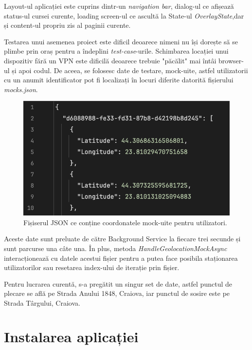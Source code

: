 Layout-ul aplicației este cuprins dintr-un \textit{navigation bar}, dialog-ul ce afișează status-ul cursei curente, loading screen-ul
ce ascultă la State-ul \textit{OverlayState},dar și content-ul propriu zis al paginii curente.

Testarea unui asemenea proiect este dificil deoarece nimeni nu își dorește să se plimbe prin oraș pentru a îndeplini \textit{test-case}-urile.
Schimbarea locației unui dispozitiv fără un VPN este dificilă deoarece trebuie "păcălit" mai întâi browser-ul și apoi codul.
De aceea, se folosesc date de testare, mock-uite, astfel utilizatorii cu un anumit identificator pot fi localizați în locuri
diferite datorită fișierului \textit{mocks.json}.

\begin{figure}[H]
    \centering
    \includegraphics[width=14cm]{Assets/dynamicMocks.png}
    \caption{Fișiserul JSON ce conține coordonatele mock-uite pentru utilizatori.}
    \label{fig:dynamicMocks}
\end{figure}

Aceste date sunt preluate de către Background Service la fiecare trei secunde și sunt parcurse una câte una.
În plus, metoda \textit{HandleGeolocationMockAsync} interacționează cu datele acestui fișier pentru a putea
face posibila staționarea utilizatorilor sau resetarea index-ului de iterație prin fișier.

Pentru lucrarea curentă, s-a pregătit un singur set de date, astfel punctul de plecare se află
pe Strada Anului 1848, Craiova, iar punctul de sosire este pe Strada Târgului, Craiova.

\section{Instalarea aplicației}

